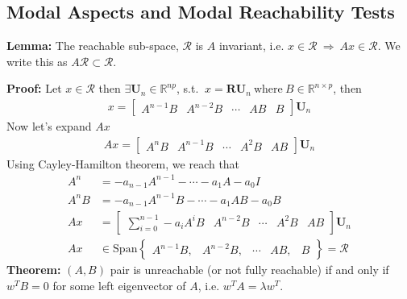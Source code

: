 \documentclass[twoside]{article}
\begin{document}
\subsection{Modal Aspects and Modal Reachability Tests}

\textbf{Lemma:} The reachable sub-space, $\mathcal{R}$ is $A$ invariant, i.e. $x\in \mathcal{R} \ \Rightarrow \ A x \in \mathcal{R}$. We 
write this as $A \mathcal{R} \subset \mathcal{R}$.

\textbf{Proof:} Let $x \in \mathcal{R}$ then $\exists \textbf{U}_n \in \mathbb{R}^{n p}$, s.t. $\ x = \mathbf{R} \textbf{U}_n 
 \ \mathrm{where} \ B \in \mathbb{R}^{n \times p}$, then
%
\begin{align*}
 x = \left[ \begin{array}{c|c|c|c|c} A^{n-1} B & A^{n-2} B &
         \cdots & A B & B \end{array} \right] \textbf{U}_n 
\end{align*}
%
Now let's expand $A x$
%
\begin{align*}
 A x = \left[ \begin{array}{c|c|c|c|c} A^{n} B & A^{n-1} B &
         \cdots & A^2 B & A B \end{array} \right] \textbf{U}_n 
\end{align*}
%
Using Cayley-Hamilton theorem, we reach that
%
%
\begin{align*}
 A^n &= -a_{n-1} A^{n-1} - \cdots - a_1 A - a_0 I
 \\
 A^n B &= -a_{n-1} A^{n-1} B - \cdots - a_1 A B - a_0 B
 \\
 A x &= \left[ \begin{array}{c|c|c|c|c} \sum\limits_{i=0}^{n-1} -a_i A^{i} B & A^{n-2} B &
         \cdots & A^2 B & A B \end{array} \right] \textbf{U}_n 
 \\
 A x &\in \mathrm{Span} \left\lbrace \begin{array}{ccccc} A^{n-1} B , & A^{n-2} B , &
         \cdots & A B , & B \end{array} \right\rbrace = \mathcal{R}
\end{align*}
%
\textbf{Theorem:} $(A,B)$ pair is unreachable (or not fully reachable) if and only if $w^T B = 0$ for some left eigenvector of $A$, i.e. 
$w^T A = \lambda w^T$.
\end{document}
